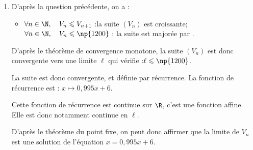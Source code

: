 \begin{enumerate}
\begin{itemize}
		\item \textbf{Hérédité :} Pour un entier $n$ naturel donné, si l'inégalité $I_n$ est vraie, on a :

		$\begin{aligned}
			V_n \leqslant V_{n+1} \leqslant \np{1200}
				&\implies 0,995V_n \leqslant 0,995V_{n+1} \leqslant 0,995 \times \np{1200} \quad \text{car } 0,995 > 0\\
				&\implies 0,995V_n \leqslant 0,995V_{n+1} \leqslant \np{1194}\\
				&\implies 0,995V_n +6 \leqslant 0,995V_{n+1} +6\leqslant \np{1194}+6\\
				&\implies V_{n + 1} \leqslant V_{n + 2} \leqslant \np{1200}\\
		\end{aligned}$

		Autrement dit, l'inégalité $I_n$ implique l'inégalité $I_{n+1}$.
		\item \textbf{Conclusion :} L'inégalité est vraie pour $n = 0$ et si une inégalité est vraie au rang $n$, alors la suivante (au rang $n+1$) l'est aussi.

		D'après le principe de récurrence, on peut en déduire que, pour tout entier naturel $n$, l'inégalité $I_n$ est vraie.

		$\forall n \in \N,\quad V_n \leqslant V_{n+1} \leqslant \np{1200}$.
	\end{itemize}

	\item D'après la question précédente, on a :
	\begin{itemize}
		\item $\forall n \in \N,\quad V_n \leqslant V_{n+1}$ :\quad  la suite $(V_n)$ est croissante;
		$\forall n \in \N,\quad V_n \leqslant \np{1200}$ : \quad la suite est majorée par .
	\end{itemize}

	D'après le théorème de convergence monotone, la suite $(V_n)$ est donc convergente vers une limite $\ell$ qui vérifie :\quad $\ell \leqslant \np{1200}$.

	La suite est donc convergente, et définie par récurrence. La fonction de récurrence est : \quad $x \longmapsto 0,995x + 6$.

	Cette fonction de récurrence est continue sur $\R$, c'est une fonction affine. Elle est donc notamment continue en $\ell$.

	D'après le théorème du point fixe, on peut donc affirmer que la limite de $V_n$ est une solution de l'équation $x = 0,995x + 6$.


\end{enumerate}
